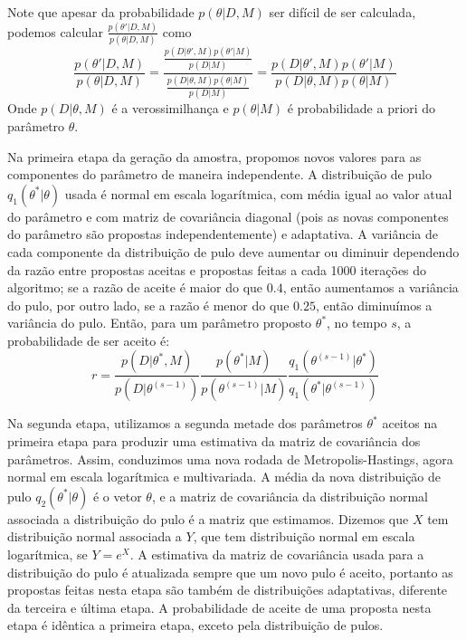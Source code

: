 \documentclass[12pt]{article}
\begin{document}
Note que apesar da probabilidade $p (\theta | D, M)$ ser difícil de ser 
calculada, podemos calcular $\frac{p(\theta'| D, M)}{p(\theta | D, M)}$ 
como
\begin{equation}
    \frac{p(\theta' | D, M)}{p(\theta | D, M)} =
    \frac{\frac{p(D | \theta', M)p(\theta' | M)}{p(D | M)}}
         {\frac{p(D | \theta, M)p(\theta | M)}{p(D | M)}}
    = \frac{p(D | \theta', M)p(\theta'| M)}
    {p (D | \theta, M)p (\theta | M)}
\end{equation}
Onde $p (D | \theta, M)$ é a verossimilhança e $p(\theta | M)$ é 
probabilidade a priori do parâmetro $\theta$.

Na primeira etapa da geração da amostra, propomos novos valores para as 
componentes do parâmetro de maneira independente. A distribuição de pulo
$q_1 (\theta^* | \theta)$ usada é normal em escala logarítmica, com média 
igual ao valor atual do parâmetro e com matriz de covariância diagonal 
(pois as novas componentes do parâmetro são propostas independentemente) 
e adaptativa. A variância de cada componente da distribuição de pulo 
deve aumentar ou diminuir dependendo da razão entre propostas aceitas e 
propostas feitas a cada 1000 iterações do algoritmo; se a razão de 
aceite é maior do que $0.4$, então aumentamos a variância do pulo, por 
outro lado, se a razão é menor do que $0.25$, então diminuímos a 
variância do pulo. Então, para um parâmetro proposto $\theta^*$, no 
tempo $s$, a probabilidade de ser aceito é:
\begin{equation}\label{accepting_ratio_first_step}
    r = \frac{p (D | \theta^*, M)}{p (D | \theta^{(s - 1)})}
        \frac{p (\theta^* | M)}{p(\theta^{(s - 1)} | M)}
        \frac{q_1 (\theta^{(s - 1)} | \theta^*)}{q_1 (\theta^* | \theta^{(s - 1)})}
\end{equation}

Na segunda etapa, utilizamos a segunda metade dos parâmetros $\theta^*$ 
aceitos na primeira etapa para produzir uma estimativa da matriz de 
covariância dos parâmetros. Assim, conduzimos uma nova rodada de 
Metropolis-Hastings, agora normal em escala logarítmica e multivariada.
A média da nova distribuição de pulo $q_2 (\theta^* | \theta)$ é o vetor 
$\theta$, e a matriz de covariância da distribuição normal associada a
distribuição do pulo é a matriz que estimamos. Dizemos que $X$ tem 
distribuição normal associada a $Y$, que tem distribuição normal em 
escala logarítmica, se $Y = e ^ X$. A estimativa da matriz de 
covariância usada para a distribuição do pulo é atualizada sempre que um
novo pulo é aceito, portanto as propostas feitas nesta etapa são também
de distribuições adaptativas, diferente da terceira e última etapa. A
probabilidade de aceite de uma proposta nesta etapa é idêntica a 
primeira etapa, exceto pela distribuição de pulos.
\end{document}
